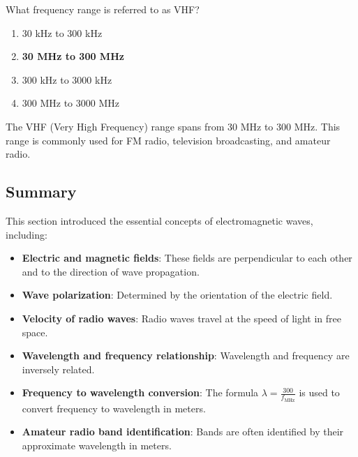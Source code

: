 
\begin{tcolorbox}[colback=gray!10!white,colframe=black!75!black,title={T3B08}]
    What frequency range is referred to as VHF?
    \begin{enumerate}[label=\Alph*),noitemsep]
        \item 30 kHz to 300 kHz
        \item \textbf{30 MHz to 300 MHz}
        \item 300 kHz to 3000 kHz
        \item 300 MHz to 3000 MHz
    \end{enumerate}
\end{tcolorbox}
The VHF (Very High Frequency) range spans from 30 MHz to 300 MHz. This range is commonly used for FM radio, television broadcasting, and amateur radio.


\subsection*{Summary}
This section introduced the essential concepts of electromagnetic waves, including:
\begin{itemize}
    \item \textbf{Electric and magnetic fields}: These fields are perpendicular to each other and to the direction of wave propagation.
    \item \textbf{Wave polarization}: Determined by the orientation of the electric field.
    \item \textbf{Velocity of radio waves}: Radio waves travel at the speed of light in free space.
    \item \textbf{Wavelength and frequency relationship}: Wavelength and frequency are inversely related.
    \item \textbf{Frequency to wavelength conversion}: The formula $\lambda = \frac{300}{f_{\text{MHz}}}$ is used to convert frequency to wavelength in meters.
    \item \textbf{Amateur radio band identification}: Bands are often identified by their approximate wavelength in meters.
\end{itemize}
